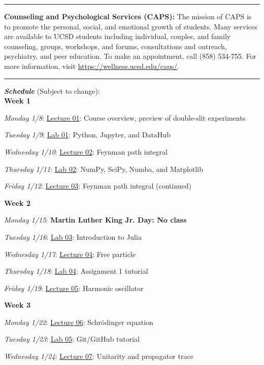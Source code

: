 \documentclass[12pt]{article}
\begin{document}
\begin{center}
  \rule{\textwidth}{0.5pt}
\end{center}

\noindent\textbf{Counseling and Psychological Services (CAPS):} The mission of CAPS is to promote the personal, social, and emotional growth of students.
Many services are available to UCSD students including individual, couples, and family counseling, groups, workshops, and forums, consultations and outreach, psychiatry, and peer education.
To make an appointment, call (858) 534-755.
For more information, visit \href{https://wellness.ucsd.edu/caps/}{https://wellness.ucsd.edu/caps/}.

\begin{center}
  \rule{\textwidth}{0.5pt}
\end{center}

\noindent\textbf{\emph{Schedule}} (Subject to change):\\

\noindent\textbf{Week 1}

\emph{Monday 1/8}: \underline{Lecture 01}: Course overview, preview of double-slit experiments

\emph{Tuesday 1/9}: \underline{Lab 01}: Python, Jupyter, and DataHub

\emph{Wednesday 1/10}: \underline{Lecture 02}: Feynman path integral

\emph{Thursday 1/11}: \underline{Lab 02}: NumPy, SciPy, Numba, and Matplotlib

\emph{Friday 1/12}: \underline{Lecture 03}: Feynman path integral (continued)

\noindent\textbf{Week 2}

\emph{Monday 1/15}: \textbf{Martin Luther King Jr. Day: No class}

\emph{Tuesday 1/16}: \underline{Lab 03}: Introduction to Julia

\emph{Wednesday 1/17}: \underline{Lecture 04}: Free particle

\emph{Thursday 1/18}: \underline{Lab 04}: Assignment 1 tutorial

\emph{Friday 1/19}: \underline{Lecture 05}: Harmonic oscillator

\noindent\textbf{Week 3}

\emph{Monday 1/22}: \underline{Lecture 06}: Schr\"{o}dinger equation

\emph{Tuesday 1/23}: \underline{Lab 05}: Git/GitHub tutorial

\emph{Wednesday 1/24}: \underline{Lecture 07}: Unitarity and propagator trace
\end{document}
